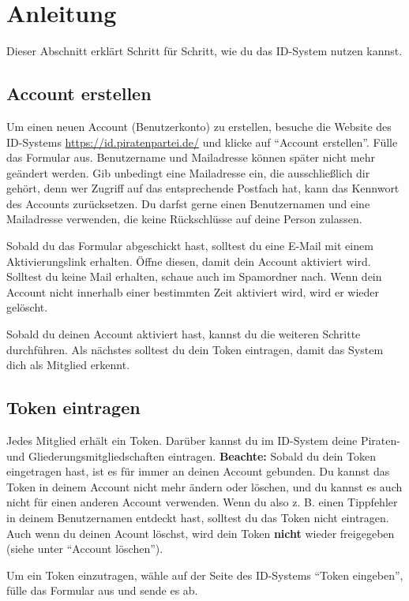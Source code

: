 \newpage
\section{Anleitung}
Dieser Abschnitt erklärt Schritt für Schritt, wie du das ID-System nutzen kannst.

\subsection{Account erstellen}
Um einen neuen Account (Benutzerkonto) zu erstellen, besuche die Website des ID-Systems \url{https://id.piratenpartei.de/} und klicke auf "`Account erstellen"'.
Fülle das Formular aus.
Benutzername und Mailadresse können später nicht mehr geändert werden.
Gib unbedingt eine Mailadresse ein, die ausschließlich dir gehört, denn wer Zugriff auf das entsprechende Postfach hat, kann das Kennwort des Accounts zurücksetzen.
Du darfst gerne einen Benutzernamen und eine Mailadresse verwenden, die keine Rück\-schlüs\-se auf deine Person zulassen.

Sobald du das Formular abgeschickt hast, solltest du eine E-Mail mit einem Aktivierungslink erhalten.
Öffne diesen, damit dein Account aktiviert wird.
Solltest du keine Mail erhalten, schaue auch im Spamordner nach.
Wenn dein Account nicht innerhalb einer bestimmten Zeit aktiviert wird, wird er wieder gelöscht.

Sobald du deinen Account aktiviert hast, kannst du die weiteren Schritte durchführen.
Als nächstes solltest du dein Token eintragen, damit das System dich als Mitglied erkennt.

\subsection{Token eintragen}
Jedes Mitglied erhält ein Token. Darüber kannst du im ID-System deine Piraten- und Gliederungsmitgliedschaften eintragen.
\textbf{Beachte:} Sobald du dein Token eingetragen hast, ist es für immer an deinen Account gebunden.
Du kannst das Token in deinem Account nicht mehr ändern oder löschen, und du kannst es auch nicht für einen anderen Account verwenden.
Wenn du also z. B. einen Tippfehler in deinem Benutzernamen entdeckt hast, solltest du das Token nicht eintragen.
Auch wenn du deinen Acount löschst, wird dein Token \textbf{nicht} wieder freigegeben (siehe unter "`Account löschen"').

Um ein Token einzutragen, wähle auf der Seite des ID-Systems "`Token eingeben"', fülle das Formular aus und sende es ab.


